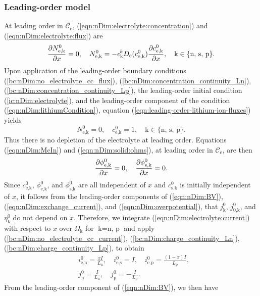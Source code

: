 \documentclass[a4paper]{article}
\newcommand{\ts}[1]{_{\text{#1}}}
\newcommand{\kin}[1]{\text{k} \in \{\text{#1}\}}
\begin{document}
\subsubsection{Leading-order model}
At leading order in $\mathcal{C}\ts{e}$, (\ref{eqn:nDim:electrolyte:concentration}) and (\ref{eqn:nDim:electrolyte:flux}) are
\begin{equation} \label{eqn:leading-order-lithium-ion-fluxes}
  \pdv{N\ts{e,k}^0}{x} = 0, \quad N\ts{e,k}^0 = -\epsilon\ts{k}^bD\ts{e}(c\ts{e,k}^0) \pdv{c\ts{e,k}^0}{x}, \quad \kin{n, s, p}.
\end{equation}
Upon application of the leading-order boundary conditions (\ref{bc:nDim:no_electrolyte_cc_flux}), (\ref{bc:nDim:concentration_continuity_Ln}), (\ref{bc:nDim:concentration_continuity_Lp}), the leading-order initial condition (\ref{ic:nDim:electrolyte}), and the leading-order component of the condition (\ref{eqn:nDim:lithiumCondition}), equation (\ref{eqn:leading-order-lithium-ion-fluxes}) yields
\begin{equation}
  N\ts{e,k}^0 = 0, \quad c\ts{e,k}^0 = 1, \quad \kin{n, s, p}.
\end{equation}
Thus there is no depletion of the electrolyte at leading order. Equations (\ref{eqn:nDim:McIn}) and (\ref{eqn:nDim:solid:ohms}), at leading order in $\mathcal{C}\ts{e}$, are then 
\begin{equation}\label{eqn:lo:phi_const}
	\pdv{\phi\ts{e,k}^0}{x} = 0, \quad \pdv{\phi\ts{s,k}^0}{x} = 0.
\end{equation}
Since $c\ts{e,k}^0$, $\phi\ts{e,k}^0$, and $\phi\ts{s,k}^0$ are all independent of $x$ and $c\ts{s,k}^0$ is initially independent of $x$, it follows from the leading-order components of (\ref{eqn:nDim:BV}), (\ref{eqn:nDim:exchange_current}), and (\ref{eqn:nDim:overpotential}), that $j\ts{k}^0$, $j\ts{$0$,k}^0$, and $\eta\ts{k}^0$ do not depend on $x$. Therefore, we integrate (\ref{eqn:nDim:electrolyte:current}) with respect to $x$ over $\Omega\ts{k}$ for $\text{k}=\text{n, p}$ and apply (\ref{bc:nDim:no_electrolyte_cc_current}), (\ref{bc:nDim:charge_continuity_Ln}), (\ref{bc:nDim:charge_continuity_Lp}), to obtain
\begin{align}
    \label{eqn:lo:current} 
	&i\ts{e,n}^0 = \frac{xI}{L\ts{n}}, \quad i\ts{e,s}^0=I, \quad i\ts{e,p}^0 = \frac{(1-x)I}{L\ts{p}}, \\ 
    \label{eqn:lo:G0}
	&j\ts{n}^0 = \frac{I}{L\ts{n}}, \quad j\ts{p}^0 = -\frac{I}{L\ts{p}}.
\end{align}
From the leading-order component of (\ref{eqn:nDim:BV}), we then have 
\end{document}
